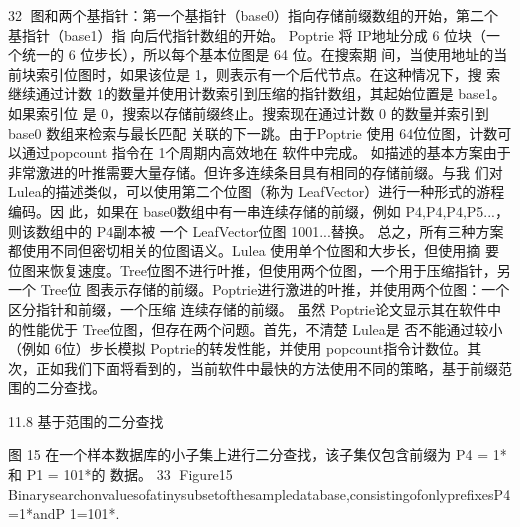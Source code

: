                                                     32
图和两个基指针：第一个基指针（base0）指向存储前缀数组的开始，第二个基指针（base1）指
向后代指针数组的开始。
Poptrie 将 IP地址分成 6 位块（一个统一的 6 位步长），所以每个基本位图是 64 位。在搜索期
间，当使用地址的当前块索引位图时，如果该位是 1，则表示有一个后代节点。在这种情况下，搜
索继续通过计数 1的数量并使用计数索引到压缩的指针数组，其起始位置是 base1。如果索引位
是 0，搜索以存储前缀终止。搜索现在通过计数 0 的数量并索引到 base0 数组来检索与最长匹配
关联的下一跳。由于Poptrie 使用 64位位图，计数可以通过popcount 指令在 1个周期内高效地在
软件中完成。
如描述的基本方案由于非常激进的叶推需要大量存储。但许多连续条目具有相同的存储前缀。与我
们对 Lulea的描述类似，可以使用第二个位图（称为 LeafVector）进行一种形式的游程编码。因
此，如果在 base0数组中有一串连续存储的前缀，例如 P4,P4,P4,P5...，则该数组中的 P4副本被
一个 LeafVector位图 1001...替换。
总之，所有三种方案都使用不同但密切相关的位图语义。Lulea 使用单个位图和大步长，但使用摘
要位图来恢复速度。Tree位图不进行叶推，但使用两个位图，一个用于压缩指针，另一个 Tree位
图表示存储的前缀。Poptrie进行激进的叶推，并使用两个位图：一个区分指针和前缀，一个压缩
连续存储的前缀。
虽然 Poptrie论文显示其在软件中的性能优于 Tree位图，但存在两个问题。首先，不清楚 Lulea是
否不能通过较小（例如 6位）步长模拟 Poptrie的转发性能，并使用 popcount指令计数位。其
次，正如我们下面将看到的，当前软件中最快的方法使用不同的策略，基于前缀范围的二分查找。



11.8 基于范围的二分查找




图 15 在一个样本数据库的小子集上进行二分查找，该子集仅包含前缀为 P4 = 1*和 P1 = 101*的
数据。
                                                     33
Figure15
Binarysearchonvaluesofatinysubsetofthesampledatabase,consistingofonlyprefixesP4=1*andP
1=101*.

